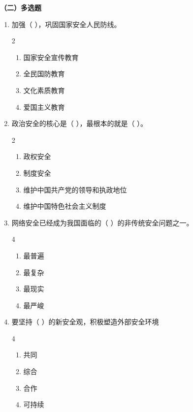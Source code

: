 \documentclass[a4paper,11pt]{ctexart}
\begin{document}
\textbf{（二）多选题}
\begin{enumerate}
    \item 加强（ ），巩固国家安全人民防线。
    \begin{multicols}{2}
    \begin{enumerate}
        \item 国家安全宣传教育
        \item 全民国防教育
        \item 文化素质教育
        \item 爱国主义教育
    \end{enumerate}
    \end{multicols}

    \item 政治安全的核心是（ ），最根本的就是（ ）。
    \begin{multicols}{2}
    \begin{enumerate}
        \item 政权安全
        \item 制度安全
        \item 维护中国共产党的领导和执政地位
        \item 维护中国特色社会主义制度
    \end{enumerate}
    \end{multicols}

    \item 网络安全已经成为我国面临的（ ）的非传统安全问题之一。
    \begin{multicols}{4}
    \begin{enumerate}
        \item 最普遍
        \item 最复杂
        \item 最现实
        \item 最严峻
    \end{enumerate}
    \end{multicols}

    \item 要坚持（ ）的新安全观，积极塑造外部安全环境
    \begin{multicols}{4}
    \begin{enumerate}
        \item 共同
        \item 综合
        \item 合作
        \item 可持续
    \end{enumerate}
    \end{multicols}


\end{enumerate}
\end{document}
